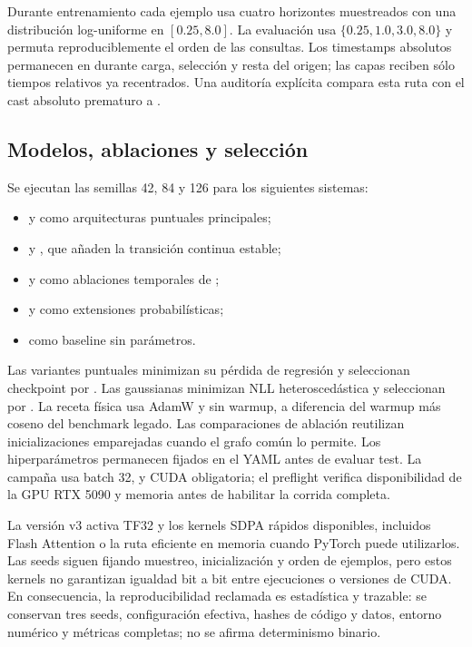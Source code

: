 Durante entrenamiento cada ejemplo usa cuatro horizontes muestreados con una distribución log-uniforme en $[0.25,8.0]$. La evaluación usa $\{0.25,1.0,3.0,8.0\}$ y permuta reproduciblemente el orden de las consultas. Los timestamps absolutos permanecen en  durante carga, selección y resta del origen; las capas reciben sólo tiempos relativos ya recentrados. Una auditoría explícita compara esta ruta con el cast absoluto prematuro a .

\subsection{Modelos, ablaciones y selección}

Se ejecutan las semillas 42, 84 y 126 para los siguientes sistemas:
\begin{itemize}
    \item {} y  como arquitecturas puntuales principales;
    \item {} y , que añaden la transición continua estable;
    \item {} y  como ablaciones temporales de \QueryCross;
    \item {} y  como extensiones probabilísticas;
    \item {} como baseline sin parámetros.
\end{itemize}
Las variantes puntuales minimizan su pérdida de regresión y seleccionan checkpoint por . Las gaussianas minimizan NLL heteroscedástica y seleccionan por . La receta física usa AdamW y  sin warmup, a diferencia del warmup más coseno del benchmark legado. Las comparaciones de ablación reutilizan inicializaciones emparejadas cuando el grafo común lo permite. Los hiperparámetros permanecen fijados en el YAML antes de evaluar test. La campaña usa batch 32,  y CUDA obligatoria; el preflight verifica disponibilidad de la GPU RTX 5090 y memoria antes de habilitar la corrida completa.

La versión v3 activa TF32 y los kernels SDPA rápidos disponibles, incluidos Flash Attention o la ruta eficiente en memoria cuando PyTorch puede utilizarlos. Las seeds siguen fijando muestreo, inicialización y orden de ejemplos, pero estos kernels no garantizan igualdad bit a bit entre ejecuciones o versiones de CUDA. En consecuencia, la reproducibilidad reclamada es estadística y trazable: se conservan tres seeds, configuración efectiva, hashes de código y datos, entorno numérico y métricas completas; no se afirma determinismo binario.

